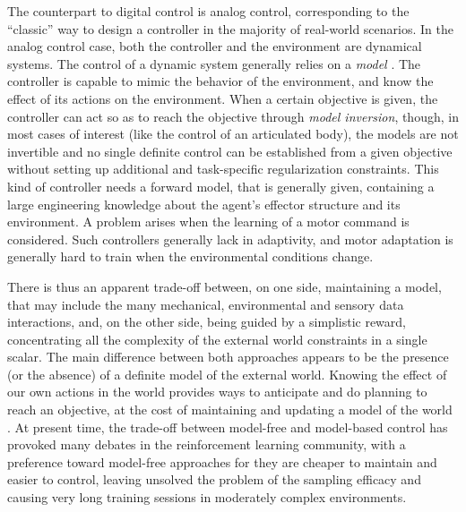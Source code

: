 \documentclass[runningheads]{llncs}
\begin{document}
The counterpart to digital control is analog control, corresponding to the ``classic'' way to design a controller in the majority of real-world scenarios. In the analog control case, both the controller and the environment are dynamical systems. 
The control of a dynamic system generally relies on a \emph{model} \cite{miall1996forward}. 
The controller is capable to mimic the
behavior of the environment, and know the effect of its actions on the environment. 
When a certain objective is given, the controller can 
act so as to reach the objective through \emph{model inversion}, though, in most cases of interest (like the control of an articulated body), the models are not invertible and no single definite control can be established from a given objective \cite{jordan1992forward} without setting up additional and task-specific regularization constraints. 
This kind of controller needs a forward model, that is generally given, containing a large engineering knowledge about the agent's effector structure and its environment. 
A problem arises when the learning of a motor command is considered. Such controllers generally lack in adaptivity, and motor adaptation is generally hard to train when the environmental 
 conditions change. 
 
There is thus an apparent trade-off between, on one side, maintaining a model, that may include the many mechanical, environmental and sensory data interactions, and, on the other side,  being guided by a simplistic reward, concentrating all the complexity of the external world constraints in a single scalar.
The main difference between both approaches appears to be the presence (or the absence) of a definite model of the external world. Knowing the effect of our own actions in the world provides ways to anticipate and do planning to reach an objective, at the cost of maintaining and updating a model of the world \cite{kurutach2018model}. 
At present time, the trade-off between model-free and model-based control has provoked many debates in the reinforcement learning community, with a preference toward model-free approaches for they are cheaper to maintain and easier to control, leaving unsolved the problem of the sampling efficacy and causing very long training sessions in moderately complex environments.
 
\end{document}
